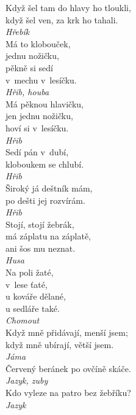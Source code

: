 \begin{multicols}{4}
\noindent
Když šel tam do hlavy ho tloukli,\\
když šel ven, za krk ho tahali.\\[1 mm]
{\sl Hřebík}\\

\noindent
Má to klobouček,\\
jednu nožičku,\\
pěkně si sedí\\
v~mechu v~lesíčku.\\[1 mm]
{\sl Hřib, houba}\\

\noindent
Má pěknou hlavičku,\\
jen jednu nožičku,\\
hoví si v~lesíčku.\\[1 mm]
{\sl Hřib}\\

\noindent
Sedí pán v~dubí,\\
kloboukem se chlubí.\\[1 mm]
{\sl Hřib}\\

\noindent
Široký já deštník mám,\\
po dešti jej rozvírám.\\[1 mm]
{\sl Hřib}\\

\noindent
Stojí, stojí žebrák,\\
má záplatu na záplatě,\\
ani šos mu neznat.\\[1 mm]
{\sl Husa}\\

\noindent
Na poli žaté,\\
v~lese ťaté,\\
u kováře dělané,\\
u sedláře také.\\[1 mm]
{\sl Chomout}\\

\noindent
Když mně přidávají, menší jsem;\\
když mně ubírají, větší jsem.\\[1 mm]
{\sl Jáma}\\

\noindent
Červený beránek po ovčíně skáče.\\[1 mm]
{\sl Jazyk, zuby}\\

\noindent
Kdo vyleze na patro bez žebříku?\\[1 mm]
{\sl Jazyk}\\


\end{multicols}
